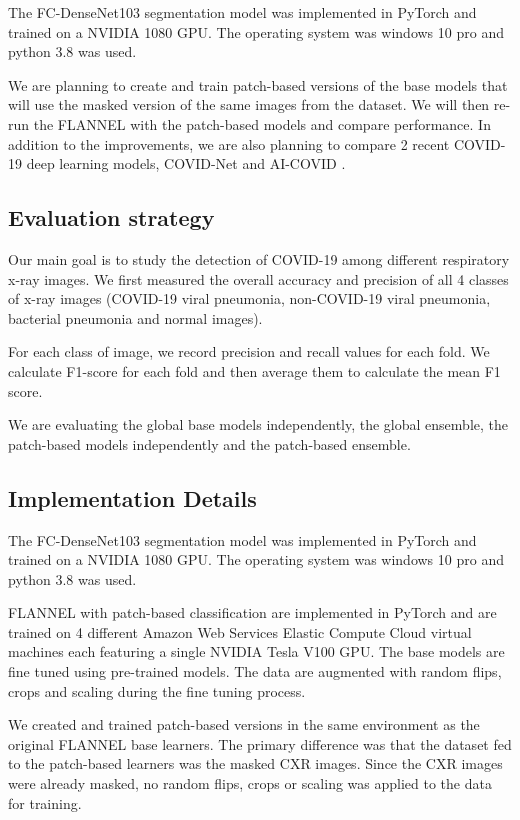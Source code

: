 \documentclass{sigkddExp}
\begin{document}
The FC-DenseNet103 segmentation model was implemented in PyTorch and trained on a NVIDIA 1080 GPU. The operating system was windows 10 pro and python 3.8 was used.

We are planning to create and train patch-based versions of the base models
that will use the masked version of the same images from the dataset. We will
then re-run the FLANNEL with the patch-based models and compare performance.
In addition to the improvements, we are  also planning to compare 2 recent
COVID-19 deep learning models, COVID-Net \cite{wang2020covidnet} and AI-COVID
\cite{pmid32339081}.


\subsection{Evaluation strategy}
Our main goal is to study the detection of COVID-19 among different respiratory
x-ray images. We first measured the overall accuracy and precision of all 4
classes of x-ray images (COVID-19 viral pneumonia, non-COVID-19 viral pneumonia,
bacterial pneumonia and normal images).

For each class of image, we record precision and recall values for each fold.
We calculate F1-score for each fold and then average them to calculate the mean
F1 score.

We are evaluating the global base models independently, the global ensemble,
the patch-based models independently and the patch-based ensemble.

\subsection{Implementation Details}
The FC-DenseNet103 segmentation model was implemented in PyTorch and trained on
a NVIDIA 1080 GPU. The operating system was windows 10 pro and python 3.8 was
used.

FLANNEL with patch-based classification are implemented in PyTorch and are
trained on 4 different Amazon Web Services Elastic Compute Cloud virtual
machines each featuring a single NVIDIA Tesla V100 GPU. The base models are fine
tuned using pre-trained models. The data are augmented with random flips, crops
and scaling during the fine tuning process.


We created and trained patch-based versions in the same environment as the
original FLANNEL base learners. The primary difference was that the dataset fed
to the patch-based learners was the masked CXR images. Since the CXR images were
already masked, no random flips, crops or scaling was applied to the data for
training.
\end{document}
